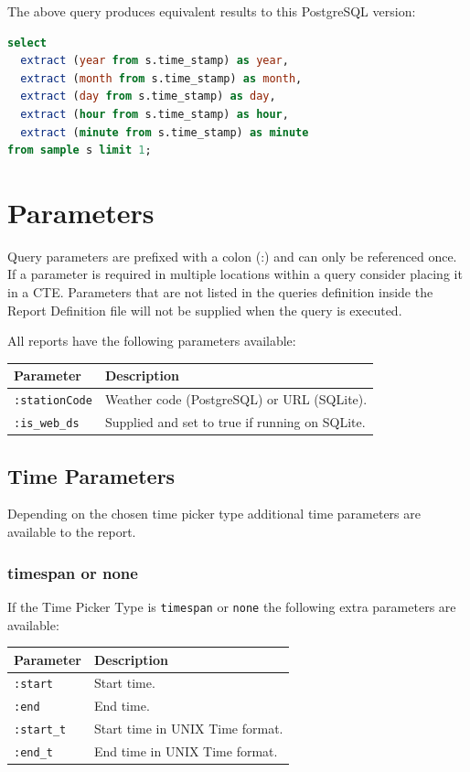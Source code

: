 \documentclass[a4paper,10pt]{book}
\begin{document}
The above query produces equivalent results to this PostgreSQL version:
\begin{lstlisting}[language=SQL]
select
  extract (year from s.time_stamp) as year,
  extract (month from s.time_stamp) as month,
  extract (day from s.time_stamp) as day,
  extract (hour from s.time_stamp) as hour,
  extract (minute from s.time_stamp) as minute
from sample s limit 1;
\end{lstlisting}


\section{Parameters}
Query parameters are prefixed with a colon (:) and can only be referenced once. If a parameter is required in multiple locations within a query consider placing it in a CTE.
Parameters that are not listed in the queries definition inside the Report Definition file will not be supplied when the query is executed.

All reports have the following parameters available:

\begin{tabular}{p{2.5cm} l}
\hline
\textbf{Parameter} & \textbf{Description} \\
\hline
\verb|:stationCode| & Weather code (PostgreSQL) or URL (SQLite).\\
\verb|:is_web_ds| & Supplied and set to true if running on SQLite.\\
\hline
\end{tabular}

\subsection{Time Parameters}
Depending on the chosen time picker type additional time parameters are available to the report.

\subsubsection{timespan or none}
If the Time Picker Type is \verb|timespan| or \verb|none| the following extra parameters are available:

\begin{tabular}{p{2.5cm} l}
\hline
\textbf{Parameter} & \textbf{Description} \\
\hline
\verb|:start| & Start time.\\
\verb|:end| & End time.\\
\verb|:start_t| & Start time in UNIX Time format.\\
\verb|:end_t| & End time in UNIX Time format.\\
\hline
\end{tabular}
\end{document}
